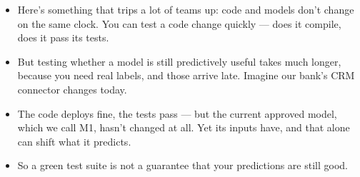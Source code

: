\documentclass[11pt,a4paper]{article}
\begin{document}
\begin{examplebox}[title after break={SPOKEN SCRIPT --- slide 3 continued}]
\begin{itemize}
\item Here's something that trips a lot of teams up: code and models don't change on the same clock. You can test a code change quickly — does it compile, does it pass its tests.
\item But testing whether a model is still predictively useful takes much longer, because you need real labels, and those arrive late. Imagine our bank's CRM connector changes today.
\item The code deploys fine, the tests pass — but the current approved model, which we call M1, hasn't changed at all. Yet its inputs have, and that alone can shift what it predicts.
\item So a green test suite is not a guarantee that your predictions are still good.
\end{itemize}
\end{examplebox}
\par\noindent{\scriptsize\textcolor{teal!60!black}{Reading anchor: Kalinowski, Ch. 13–14 · Bass, Ch. 11}}
\clearpage
\end{document}

